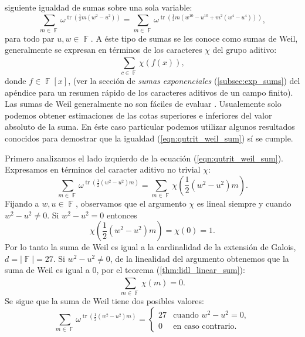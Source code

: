 \documentclass[a4paper,11pt]{report}
\DeclareMathOperator{\F}{\mathbb{F}}
\DeclareMathOperator{\tr}{tr}
\begin{document}
  siguiente igualdad de sumas sobre una sola variable:
  \begin{equation}
    \label{eqn:qutrit_weil_sum}
    \sum_{m \in \F}^{}
    \omega^{\tr\left( 
        \frac{1}{2} m \left( w^2 - u^2 \right) 
    \right) }
    =
    \sum_{m \in \F}^{} 
    \omega^{\tr\left( 
        \frac{1}{2} m\left( w^{10}-u^{10} + m^2(w^{4}-u^{4})
        \right) 
    \right) },
  \end{equation}
  para todo par $u,w \in \F$. A éste tipo de sumas se les
  conoce como sumas de Weil, generalmente se expresan en
  términos de los caracteres $\chi$ del grupo aditivo:
  \begin{equation}
    \sum_{c \in \F}^{} \chi(f(x)),
  \end{equation}
  donde $f \in \F[x]$, (ver la sección de \textit{sumas
  exponenciales} (\ref{subsec:exp_sums}) del apéndice para
  un resumen rápido de los caracteres aditivos de un campo
  finito). Las sumas de Weil generalmente no son fáciles de
  evaluar \cite{lidl1994}.  Usualemente solo podemos obtener
  estimaciones de las cotas superiores e inferiores del
  valor absoluto de la suma. En éste caso particular podemos
  utilizar algunos resultados conocidos para demostrar que
  la igualdad (\ref{eqn:qutrit_weil_sum}) sí se cumple.

  Primero analizamos el lado izquierdo de la ecuación
  (\ref{eqn:qutrit_weil_sum}). Expresamos en términos del
  caracter aditivo no trivial $\chi$:
  \begin{equation}
    \sum_{m \in \F}^{} \omega^{\tr\left( \frac{1}{2} \left(
    w^2-u^2\right) m \right) }
    = \sum_{m \in \F}^{} \chi\left( \frac{1}{2} \left(
    w^2-u^2 \right) m \right).
  \end{equation}
  Fijando a $w, u \in \F$, observamos que el argumento
  $\chi$ es lineal siempre y cuando $w^2-u^2 \neq 0$. Si
  $w^2-u^2 = 0$ entonces
  \begin{equation}
    \chi\left( \frac{1}{2} \left(w^2-u^2\right) m \right) 
    = \chi(0)
    = 1.
  \end{equation}
  Por lo tanto la suma de Weil es igual a la cardinalidad de
  la extensión de Galois, $d = |\F| = 27$. Si $w^2-u^2 \neq
  0$, de la linealidad del argumento obtenemos que la suma
  de Weil es igual a 0, por el teorema
  (\ref{thm:lidl_linear_sum}):
  \begin{equation}
    \sum_{m \in \F}^{} \chi(m) = 0.
  \end{equation}
  Se sigue que la suma de Weil tiene dos posibles valores:
  \begin{equation}
    \label{eqn:left_weil_sum}
    \sum_{m \in \F}^{} \omega^{\tr\left(
    \frac{1}{2}(w^2-u^2)m \right) }
    = 
    \begin{cases}
      27 & \text{cuando } w^2-u^2 = 0, \\
      0 & \text{en caso contrario}.
    \end{cases}
  \end{equation}
\end{document}
